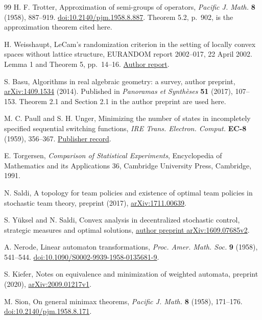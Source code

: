 \begin{thebibliography}{99}
H. F. Trotter, Approximation of semi-groups of operators,
\emph{Pacific J. Math.} \textbf{8} (1958), 887--919.
\href{https://doi.org/10.2140/pjm.1958.8.887}{doi:10.2140/pjm.1958.8.887}.
Theorem 5.2, p.~902, is the approximation theorem cited here.



H. Weisshaupt, LeCam's randomization criterion in the setting of locally
convex spaces without lattice structure, EURANDOM report 2002--017,
22 April 2002. Lemma 1 and Theorem 5, pp.~14--16.
\href{https://www.eurandom.tue.nl/reports/2002/017-report.pdf}{Author report}.

S. Basu, Algorithms in real algebraic geometry: a survey, author preprint,
\href{https://arxiv.org/abs/1409.1534}{arXiv:1409.1534} (2014).
Published in \emph{Panoramas et Synth\`eses} \textbf{51} (2017), 107--153.
Theorem 2.1 and Section 2.1 in the author preprint are used here.

M. C. Paull and S. H. Unger, Minimizing the number of states in incompletely
specified sequential switching functions, \emph{IRE Trans. Electron.
Comput.} \textbf{EC-8} (1959), 356--367.
\href{https://ieeexplore.ieee.org/document/5222697}{Publisher record}.

E. Torgersen, \emph{Comparison of Statistical Experiments},
Encyclopedia of Mathematics and its Applications 36,
Cambridge University Press, Cambridge, 1991.

N. Saldi, A topology for team policies and existence of optimal team
policies in stochastic team theory, preprint (2017),
\href{https://arxiv.org/abs/1711.00639}{arXiv:1711.00639}.

S. Y\"uksel and N. Saldi, Convex analysis in decentralized stochastic
control, strategic measures and optimal solutions,
\href{https://arxiv.org/abs/1609.07685v2}{author preprint arXiv:1609.07685v2}.

A. Nerode, Linear automaton transformations,
\emph{Proc. Amer. Math. Soc.} \textbf{9} (1958), 541--544.
\href{https://doi.org/10.1090/S0002-9939-1958-0135681-9}{doi:10.1090/S0002-9939-1958-0135681-9}.

S. Kiefer, Notes on equivalence and minimization of weighted automata,
preprint (2020),
\href{https://arxiv.org/abs/2009.01217v1}{arXiv:2009.01217v1}.

M. Sion, On general minimax theorems, \emph{Pacific J. Math.}
\textbf{8} (1958), 171--176.
\href{https://doi.org/10.2140/pjm.1958.8.171}{doi:10.2140/pjm.1958.8.171}.



\end{thebibliography}
